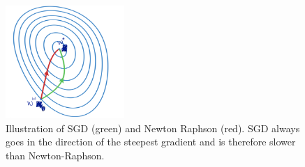 \begin{itemize}
	\begin{figure}[ht]
		\centering
		\includegraphics[width=0.4\textwidth]{figures/logistic_regression_sgd_iterat.png}
		\caption{Illustration of SGD (green) and Newton Raphson (red). SGD always goes in the direction of the steepest gradient and is therefore slower than Newton-Raphson.}
		\label{img:logistic_regression_sgd_iterat}
	\end{figure}
\end{itemize}
